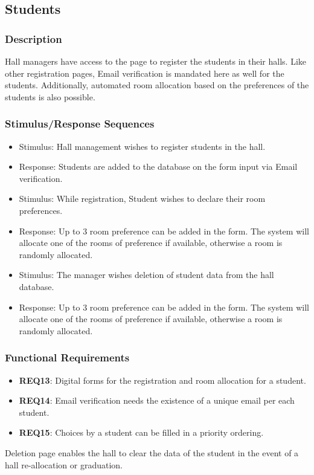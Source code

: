 \documentclass{scrreprt}
\begin{document}
\subsection{Students}
\subsubsection{Description}
Hall managers have access to the page to register the students in their halls. Like other registration pages, Email verification is mandated here as well for the students. Additionally, automated room allocation based on the preferences of the students is also possible.
\subsubsection{Stimulus/Response Sequences}
\begin{itemize}
    \item Stimulus: Hall management wishes to register students in the hall.
    \item Response: Students are added to the database on the form input via Email verification.
\end{itemize}

\begin{itemize}
    \item Stimulus: While registration, Student wishes to declare their room preferences.
    \item Response: Up to 3 room preference can be added in the form. The system will allocate one of the rooms of preference if available, otherwise a room is randomly allocated.
\end{itemize}

\begin{itemize}
    \item Stimulus: The manager wishes deletion of student data from the hall database.
    \item Response: Up to 3 room preference can be added in the form. The system will allocate one of the rooms of preference if available, otherwise a room is randomly allocated.
\end{itemize}

\subsubsection{Functional Requirements}
\begin{itemize}
    \item \textbf{REQ13}: Digital forms for the registration and room allocation for a student.
    \item \textbf{REQ14}: Email verification needs the existence of a unique email per each student.
    \item \textbf{REQ15}: Choices by a student can be filled in a priority ordering.
\end{itemize}
Deletion page enables the hall to clear the data of the student in the event of a hall re-allocation or graduation.
\end{document}
